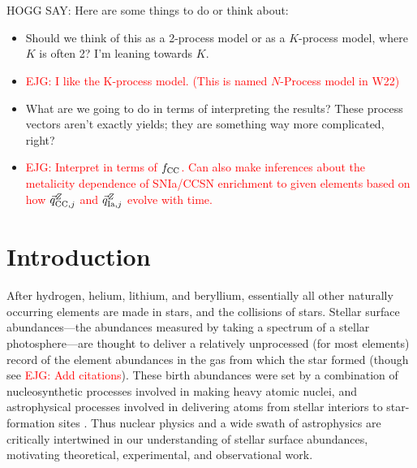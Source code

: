 \documentclass[modern]{aastex631}
\newcommand{\qcc}{\vec{q}_{{\rm CC,}j}^{Z}}
\newcommand{\qIa}{\vec{q}_{{\rm Ia,}j}^{Z}}
\newcommand{\fcc}{f_{\rm CC}}
\newcommand{\ejg}[1]{\textcolor{red}{EJG: #1}}
\begin{document}

\section*{}\clearpage
HOGG SAY: Here are some things to do or think about:
\begin{itemize}
  \item Should we think of this as a 2-process model or as a $K$-process model, where $K$ is often 2? I'm leaning towards $K$.
  \item \ejg{I like the K-process model. (This is named $N$-Process model in W22)}
  \item What are we going to do in terms of interpreting the results? These process vectors aren't exactly yields; they are something way more complicated, right?
  \item \ejg{Interpret in terms of $\fcc$. Can also make inferences about the metalicity dependence of SNIa/CCSN enrichment to given elements based on how $\qcc$ and $\qIa$ evolve with time.}
\end{itemize}

\section{Introduction}\label{sec:intro}

After hydrogen, helium, lithium, and beryllium, essentially all other naturally occurring elements are made in stars, and the collisions of stars.
Stellar surface abundances---the abundances measured by taking a spectrum of a stellar photosphere---are thought to deliver a relatively unprocessed (for most elements) record of the element abundances in the gas from which the star formed (though see \ejg{Add citations}).
These birth abundances were set by a combination of nucleosynthetic processes involved in making heavy atomic nuclei, and astrophysical processes involved in delivering atoms from stellar interiors to star-formation sites \citep[e.g.,][]{johnsonja2020}.
Thus nuclear physics and a wide swath of astrophysics are critically intertwined in our understanding of stellar surface abundances, motivating theoretical, experimental, and observational work.
\end{document}
